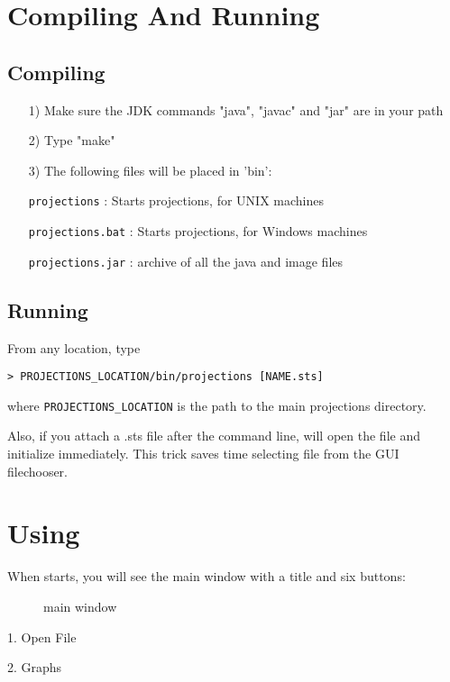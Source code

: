 \documentclass[10pt,dvips]{article}
\begin{document}
\section{Compiling And Running \projections{}}

\subsection{Compiling \projections{}}
\begin{enumerate}
\item[1)]
   Make sure the JDK commands "java", "javac" and "jar"
   are in your path
\item[2)]
   Type "make"
\item[3)]
   The following files will be placed in 'bin':

      {\tt projections}           : Starts projections, for UNIX machines

      {\tt projections.bat}       : Starts projections, for Windows machines

      {\tt projections.jar}       : archive of all the java and image files
\end{enumerate}

\subsection{Running \projections{}}
From any location, type

{\tt > PROJECTIONS\_LOCATION/bin/projections [NAME.sts]}

where {\tt PROJECTIONS\_LOCATION} is the path to the main projections
directory.

Also, if you attach a .sts file after the command line, \projections{} will
open the file and initialize immediately. This trick saves time selecting file
from the GUI filechooser.

\section{Using \projections{}}
When \projections{} starts, you will see the main window with a title and
six buttons:

\begin{figure}[htb]
\center
{}
\caption{\projections{} main window}
\label{mainwindow}
\end{figure}

1. Open File

2. Graphs
\end{document}
